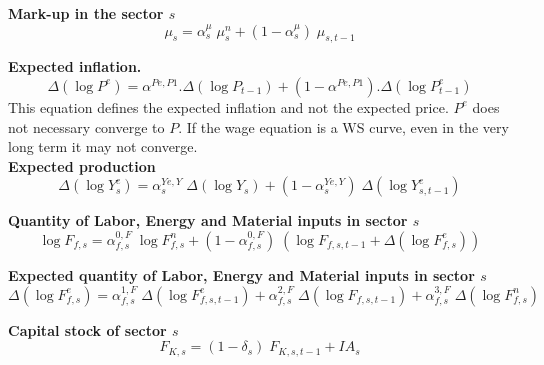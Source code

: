 \documentclass[12pt]{article}
\numberwithin{equation}{section}
\begin{document}
\noindent \textbf{Mark-up in the sector $s$} 
\begin{dmath}
\mu_{s} = \alpha^{\mu}_{s} \; \mu^{n}_{s} + \left( 1 - \alpha^{\mu}_{s} \right) \; \mu_{s, t-1}
\label{adjustments.mdlMARKUP[s]}
\end{dmath}

\noindent \textbf{Expected inflation.} 
\begin{dmath}
\varDelta \left(\operatorname{log} P^{e}\right) = \alpha^{Pe,P1} . \varDelta \left(\operatorname{log} P_{t-1}\right) + \left( 1 - \alpha^{Pe,P1} \right) . \varDelta \left(\operatorname{log} P^{e}_{t-1}\right)
\label{adjustments.mdlP_e}
\end{dmath}
This equation defines the expected inflation and not the expected price. $P^{e}$ does not necessary converge to $P$. If the wage equation is a WS curve, even in the very long term it may not converge. \\

\noindent \textbf{Expected production} 
\begin{dmath}
\varDelta \left(\operatorname{log} Y^{e}_{s}\right) = \alpha^{Ye,Y}_{s} \; \varDelta \left(\operatorname{log} Y_{s}\right) + \left( 1 - \alpha^{Ye,Y}_{s} \right) \; \varDelta \left(\operatorname{log} Y^{e}_{s, t-1}\right)
\label{adjustments.mdlY_e[s]}
\end{dmath}

\noindent \textbf{Quantity of Labor, Energy and Material inputs in sector $s$} 
\begin{dmath}
\operatorname{log} F_{f, s} = \alpha^{{0},F}_{f, s} \; \operatorname{log} F^{n}_{f, s} + \left( 1 - \alpha^{{0},F}_{f, s} \right) \; \left( \operatorname{log} F_{f, s, t-1} + \varDelta \left(\operatorname{log} F^{e}_{f, s}\right) \right)
\label{adjustments.mdlF[f, s]}
\end{dmath}

\noindent \textbf{Expected quantity of Labor, Energy and Material inputs in sector $s$} 
\begin{dmath}
\varDelta \left(\operatorname{log} F^{e}_{f, s}\right) = \alpha^{{1},F}_{f, s} \; \varDelta \left(\operatorname{log} F^{e}_{f, s, t-1}\right) + \alpha^{{2},F}_{f, s} \; \varDelta \left(\operatorname{log} F_{f, s, t-1}\right) + \alpha^{{3},F}_{f, s} \; \varDelta \left(\operatorname{log} F^{n}_{f, s}\right)
\label{adjustments.mdlF_e[f, s]}
\end{dmath}

\noindent \textbf{Capital stock of sector $s$} 
\begin{dmath}
F_{K, s} = \left( 1 - \delta_{s} \right) \; F_{K, s, t-1} + IA_{s}
\label{adjustments.mdlF[K, s]}
\end{dmath}
\end{document}
